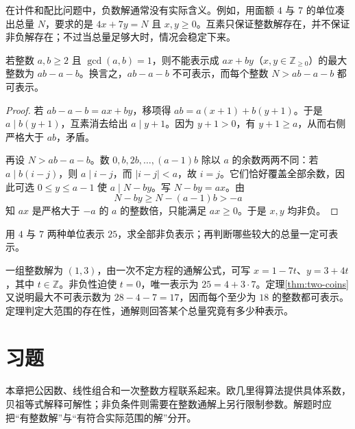 在计件和配比问题中，负数解通常没有实际含义。例如，用面额 $4$ 与 $7$ 的单位凑出总量 $N$，要求的是 $4x+7y=N$ 且 $x,y\ge0$。互素只保证整数解存在，并不保证非负解存在；不过当总量足够大时，情况会稳定下来。

\begin{theorem}[两种面额的最大不可表示数]
\label{thm:two-coins}
若整数 $a,b\ge2$ 且 $\gcd(a,b)=1$，则不能表示成 $ax+by$（$x,y\in\mathbb Z_{\ge0}$）的最大整数为 $ab-a-b$。换言之，$ab-a-b$ 不可表示，而每个整数 $N>ab-a-b$ 都可表示。
\end{theorem}
\begin{proof}
若 $ab-a-b=ax+by$，移项得 $ab=a(x+1)+b(y+1)$。于是 $a\mid b(y+1)$，互素消去给出 $a\mid y+1$。因为 $y+1>0$，有 $y+1\ge a$，从而右侧严格大于 $ab$，矛盾。

再设 $N>ab-a-b$。数 $0,b,2b,\ldots,(a-1)b$ 除以 $a$ 的余数两两不同：若 $a\mid b(i-j)$，则 $a\mid i-j$，而 $|i-j|<a$，故 $i=j$。它们恰好覆盖全部余数，因此可选 $0\le y\le a-1$ 使 $a\mid N-by$。写 $N-by=ax$。由
\[
 N-by\ge N-(a-1)b>-a
\]
知 $ax$ 是严格大于 $-a$ 的 $a$ 的整数倍，只能满足 $ax\ge0$。于是 $x,y$ 均非负。
\end{proof}

\begin{example}[存在性判据与实际求解]
用 $4$ 与 $7$ 两种单位表示 $25$，求全部非负表示；再判断哪些较大的总量一定可表示。
\end{example}
\begin{solve}
一组整数解为 $(1,3)$，由一次不定方程的通解公式，可写 $x=1-7t$、$y=3+4t$，其中 $t\in\mathbb Z$。非负性迫使 $t=0$，唯一表示为 $25=4+3\cdot7$。定理\ref{thm:two-coins}又说明最大不可表示数为 $28-4-7=17$，因而每个至少为 $18$ 的整数都可表示。定理判定大范围的存在性，通解则回答某个总量究竟有多少种表示。
\end{solve}

\section{习题}

本章把公因数、线性组合和一次整数方程联系起来。欧几里得算法提供具体系数，贝祖等式解释可解性；非负条件则需要在整数通解上另行限制参数。解题时应把“有整数解”与“有符合实际范围的解”分开。

